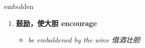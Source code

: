 
\begin{frame}
{\huge embolden}
\begin{center}
\begin{enumerate}\Large
  \item \textbf{鼓励，使大胆 encourage}
  \begin{itemize}
    \item \em{\Large{be emboldened by the wine 借酒壮胆}}
  \end{itemize}
\end{enumerate}
\end{center}
\end{frame}
